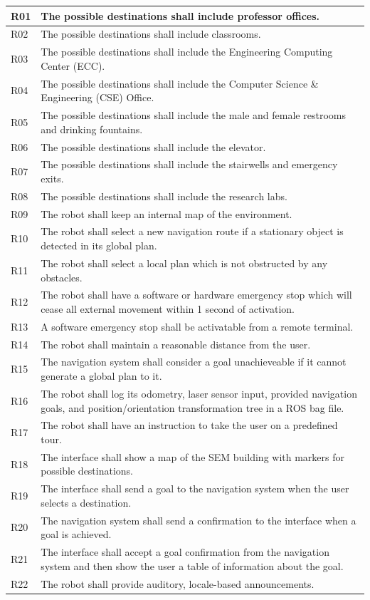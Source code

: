 \documentclass[11pt]{report}
\begin{document}
\begin{longtable}{|p{0.9cm}|p{12cm}|}
R01&The possible destinations shall include professor offices. \\ \hline
R02&The possible destinations shall include classrooms.\\ \hline
R03&The possible destinations shall include the Engineering Computing Center (ECC).\\ \hline
R04&The possible destinations shall include the Computer Science \& Engineering (CSE) Office.\\ \hline
R05&The possible destinations shall include the male and female restrooms and drinking fountains.\\ \hline
R06&The possible destinations shall include the elevator.\\ \hline
R07&The possible destinations shall include the stairwells and emergency exits.\\ \hline
R08&The possible destinations shall include the research labs.\\ \hline
R09&The robot shall keep an internal map of the environment.\\ \hline
R10&The robot shall select a new navigation route if a stationary object is detected in its global plan.\\ \hline
R11&The robot shall select a local plan which is not obstructed by any obstacles.\\ \hline
R12&The robot shall have a software or hardware emergency stop which will cease all external movement within 1 second of activation.\\ \hline
R13&A software emergency stop shall be activatable from a remote terminal.\\ \hline
R14&The robot shall maintain a reasonable distance from the user.\\ \hline
R15&The navigation system shall consider a goal unachieveable if it cannot generate a global plan to it.\\ \hline
R16&The robot shall log its odometry, laser sensor input, provided navigation goals, and position/orientation transformation tree in a ROS bag file.\\ \hline
R17&The robot shall have an instruction to take the user on a predefined tour.\\ \hline
R18&The interface shall show a map of the SEM building with markers for possible destinations.\\ \hline
R19&The interface shall send a goal to the navigation system when the user selects a destination.\\ \hline
R20&The navigation system shall send a confirmation to the interface when a goal is achieved. \\ \hline
R21&The interface shall accept a goal confirmation from the navigation system and then show the user a table of information about the goal.\\ \hline
R22&The robot shall provide auditory, locale-based announcements.\\ \hline
\end{longtable}
\end{document}

